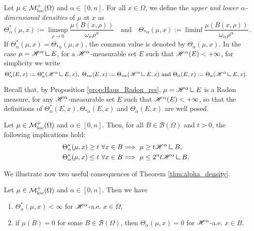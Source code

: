 \begin{definition}
Let $\mu \in \mathcal{M}^{+}_{\rm loc}(\Omega)$ and $\alpha \in [0, n]$. For all $x \in \Omega$, we define the {\em upper and lower $\alpha$-dimensional densities} of $\mu$ at $x$ as
\begin{equation*}
\Theta^{*}_{\alpha}(\mu, x) := \limsup_{\rho \to 0} \frac{\mu(B(x, \rho))}{\omega_{\alpha} \rho^{\alpha}} \quad \text{and} \quad \Theta_{* \alpha}(\mu, x) := \liminf \frac{\mu(B(x, \rho))}{\omega_{\alpha} \rho^{\alpha}}.
\end{equation*}
If $\Theta^{*}_{\alpha}(\mu, x) = \Theta_{* \alpha}(\mu, x)$, the common value is denoted by $\Theta_{\alpha}(\mu, x)$.
In the case $\mu = \Haus{\alpha} \res E$, for a $\mathscr{H}^{\alpha}$-measurable set $E$ such that $\mathscr{H}^{\alpha}(E) < + \infty$, for simplicity we write
\begin{equation*}
\Theta^{*}_{\alpha}(E, x) := \Theta^{*}_{\alpha}(\Haus{\alpha} \res E, x), \ \Theta_{* \alpha}(E, x) := \Theta_{* \alpha}(\Haus{\alpha} \res E, x) \text{ and }  \Theta_{\alpha}(E, x) := \Theta_{\alpha}(\Haus{\alpha} \res E, x).
\end{equation*}
\end{definition}
Recall that, by Proposition \ref{prop:Haus_Radon_res}, $\mu = \Haus{\alpha} \res E$ is a Radon measure, for any $\mathscr{H}^{\alpha}$-measurable set $E$ such that $\mathscr{H}^{\alpha}(E) < + \infty$, so that the definitions of $\Theta^{*}_{\alpha}(E, x), \Theta_{* \alpha}(E, x)$ and $\Theta_{\alpha}(E, x)$ are well posed.

\begin{theorem} \label{thm:alpha_density}
Let $\mu \in \mathcal{M}^{+}_{\rm loc}(\Omega)$ and $\alpha \in [0, n]$. Then, for all $B \in \mathcal{B}(\Omega)$ and $t > 0$, the following implications hold:
\begin{align}
\Theta^{*}_{\alpha}(\mu, x) \ge t \ \forall x \in B & \Longrightarrow \ \mu \ge t \Haus{\alpha} \res B, \label{eq:lower_bound_density} \\
\Theta^{*}_{\alpha}(\mu, x) \le t \ \forall x \in B & \Longrightarrow \ \mu \le 2^{\alpha} t \Haus{\alpha} \res B. \label{eq:upper_bound_density}
\end{align}
\end{theorem}

We illustrate now two useful consequences of Theorem \ref{thm:alpha_density}.

\begin{corollary}
Let $\mu \in \mathcal{M}^{+}_{\rm loc}(\Omega)$ and $\alpha \in [0, n]$. Then we have
\begin{enumerate}
\item $\Theta^{*}_{\alpha}(\mu, x) < \infty$ for $\mathscr{H}^{\alpha}$-a.e. $x \in \Omega$,
\item if $\mu(B) = 0$ for some $B \in \mathcal{B}(\Omega)$, then $\Theta_{\alpha}(\mu, x) = 0$ for $\mathscr{H}^{\alpha}$-a.e. $x \in B$.
\end{enumerate}
\end{corollary}


